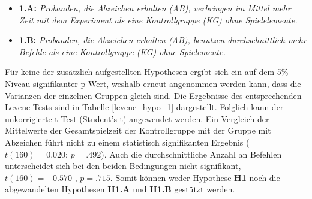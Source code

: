 \begin{itemize}
    \item \textbf{1.A:} \textit{Probanden, die Abzeichen erhalten (AB), verbringen im Mittel mehr Zeit mit dem Experiment als eine Kontrollgruppe (KG) ohne Spielelemente.}
    \item \textbf{1.B:} \textit{Probanden, die Abzeichen erhalten (AB), benutzen durchschnittlich mehr Befehle als eine Kontrollgruppe (KG) ohne Spielemente.} 
\end{itemize}

Für keine der zusätzlich aufgestellten Hypothesen ergibt sich ein auf dem 5\%-Niveau signifikanter p-Wert, weshalb erneut angenommen werden kann, dass die Varianzen der einzelnen Gruppen gleich sind. Die Ergebnisse des entsprechenden Levene-Tests sind in Tabelle \ref{levene_hypo_1} dargestellt. Folglich kann der unkorrigierte t-Test (Student's t) angewendet werden. Ein Vergleich  der  Mittelwerte  der Gesamtspielzeit der Kontrollgruppe mit der Gruppe mit Abzeichen führt nicht zu einem statistisch signifikanten Ergebnis ($t(160) = 0.020$; $p = .492$). Auch die durchschnittliche Anzahl an Befehlen unterscheidet sich bei den beiden Bedingungen nicht signifikant, $t(160) = -0.570$ , $p = .715$. Somit können weder Hypothese \textbf{H1} noch die abgewandelten Hypothesen \textbf{H1.A} und \textbf{H1.B} gestützt werden.


